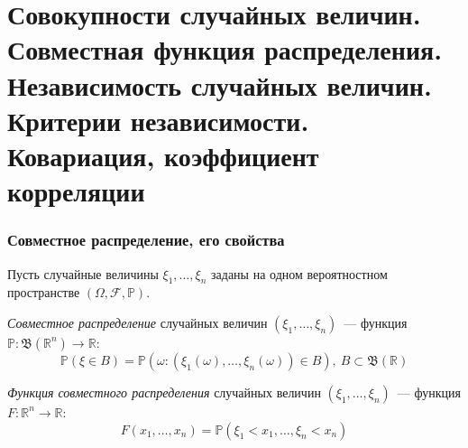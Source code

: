 \section{Совокупности случайных величин. Совместная функция распределения. Независимость случайных величин. Критерии независимости. Ковариация, коэффициент корреляции}

\subsubsection{Совместное распределение, его свойства}

Пусть случайные величины $\xi_1, \ldots, \xi_n$ заданы на одном вероятностном пространстве $(\Omega, \mathcal{F}, \mathbb{P})$.
\begin{defn}
    \textit{Совместное распределение} случайных величин $(\xi_1, \ldots, \xi_n)$~--- функция $\mathbb{P}\colon \mathfrak{B}(\mathbb{R}^{n}) \to \mathbb{R}$:
    \begin{equation*}
        \mathbb{P}(\xi \in B) = \mathbb{P}(\omega \colon (\xi_{1}(\omega), \ldots, \xi_{n}(\omega)) \in B),~ B \subset \mathfrak{B}(\mathbb{R})
    \end{equation*}
\end{defn}
\begin{defn}
    \textit{Функция совместного распределения} случайных величин $(\xi_1, \ldots, \xi_n)$~--- функция $F\colon \mathbb{R}^{n} \to \mathbb{R}$:
    \begin{equation*}
        F(x_{1}, \ldots, x_{n})=\mathbb{P}(\xi_{1}<x_{1}, \ldots, \xi_{n}<x_{n})
    \end{equation*}
\end{defn}

